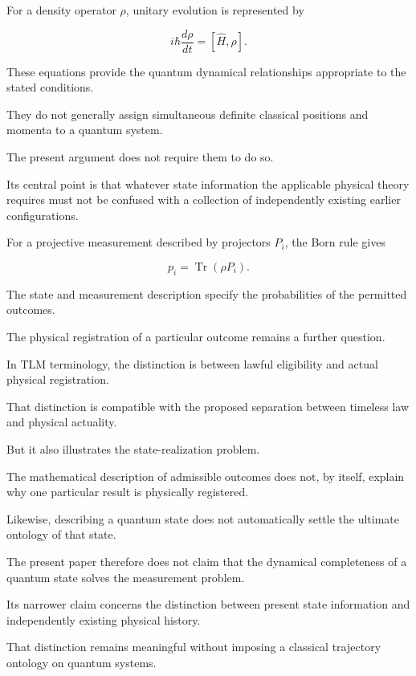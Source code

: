 \documentclass[12pt,onecolumn]{article}
\begin{document}
For a density operator $\rho$, unitary evolution is represented by

\begin{equation}
i\hbar\frac{d\rho}{dt}=[\hat H,\rho].
\end{equation}

These equations provide the quantum dynamical relationships appropriate to the stated conditions.

They do not generally assign simultaneous definite classical positions and momenta to a quantum system.

The present argument does not require them to do so.

Its central point is that whatever state information the applicable physical theory requires must not be confused with a collection of independently existing earlier configurations.

For a projective measurement described by projectors $P_i$, the Born rule gives

\begin{equation}
p_i=\operatorname{Tr}(\rho P_i).
\end{equation}

The state and measurement description specify the probabilities of the permitted outcomes.

The physical registration of a particular outcome remains a further question.

In TLM terminology, the distinction is between lawful eligibility and actual physical registration.

That distinction is compatible with the proposed separation between timeless law and physical actuality.

But it also illustrates the state-realization problem.

The mathematical description of admissible outcomes does not, by itself, explain why one particular result is physically registered.

Likewise, describing a quantum state does not automatically settle the ultimate ontology of that state.

The present paper therefore does not claim that the dynamical completeness of a quantum state solves the measurement problem.

Its narrower claim concerns the distinction between present state information and independently existing physical history.

That distinction remains meaningful without imposing a classical trajectory ontology on quantum systems.
\end{document}
